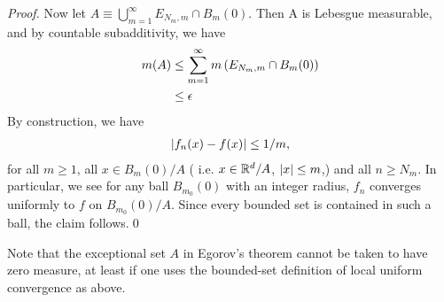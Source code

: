 \documentclass[11pt]{article}
\begin{document}
\begin{itemize}
\begin{proof}
Now let $A \equiv \bigcup_{m=1}^{\infty}E_{N_{m},m}\cap B_{m}(0)$. Then A is Lebesgue measurable, and by countable subadditivity, we have
\begin{align*}
m(A)&\le \sum_{m=1}^{\infty}m\left(E_{N_{m},m}\cap B_{m}(0)\right)\\
&\le \epsilon
\end{align*} By construction, we have
\begin{align*}
\left\lvert f_n(x) - f(x) \right\rvert \le  1/m, 
\end{align*}  for all $m\ge 1$, all $x\in B_{m}(0)/A$ ( i.e. $x\in {\mathbb R}^{d}/A$, $\left\lvert x \right\rvert\le m$,) and all $n\ge N_{m}$. In particular, we see for any ball $B_{m_{0}}(0)$ with an integer radius, $f_n$ converges uniformly to $f$ on $B_{m_{0}}(0)/A$. Since every bounded set is contained in such a ball, the claim follows.\qed
\end{proof}
Note that the exceptional set $A$ in Egorov's theorem cannot be taken to have zero measure, at least if one uses the bounded-set definition of local uniform convergence as above.
\end{itemize}
\end{document}

